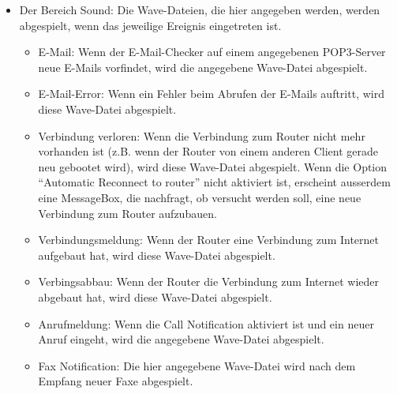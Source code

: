 \begin{itemize}
  \item Der Bereich Sound: Die Wave-Dateien, die hier angegeben werden, werden 
    abgespielt, wenn das jeweilige Ereignis eingetreten ist.
    \begin{itemize}
      \item \mbox{E-Mail}: Wenn der \mbox{E-Mail}-Checker auf einem angegebenen POP3-Server neue 
        \mbox{E-Mails} vorfindet, wird die angegebene Wave-Datei abgespielt.
      \item \mbox{E-Mail}-Error: Wenn ein Fehler beim Abrufen der \mbox{E-Mails} auftritt, wird 
        diese Wave-Datei abgespielt.
      \item Verbindung verloren: Wenn die Verbindung zum Router nicht mehr
        vorhanden ist (z.B. wenn der Router von einem anderen Client gerade neu 
        gebootet wird), wird diese Wave-Datei abgespielt. Wenn die Option 
        ``Automatic Reconnect to router'' nicht aktiviert ist, erscheint 
        ausserdem eine MessageBox, die nachfragt, ob versucht werden soll, eine 
        neue Verbindung zum Router aufzubauen.
      \item Verbindungsmeldung: Wenn der Router eine Verbindung zum Internet
        aufgebaut hat, wird diese Wave-Datei abgespielt.
      \item Verbingsabbau: Wenn der Router die Verbindung zum Internet wieder 
        abgebaut hat, wird diese Wave-Datei abgespielt.
      \item Anrufmeldung: Wenn die Call Notification aktiviert ist und ein neuer 
        Anruf eingeht, wird die angegebene Wave-Datei abgespielt.
      \item Fax Notification: Die hier angegebene Wave-Datei wird nach dem 
        Empfang neuer Faxe abgespielt.
    \end{itemize}


\end{itemize}
